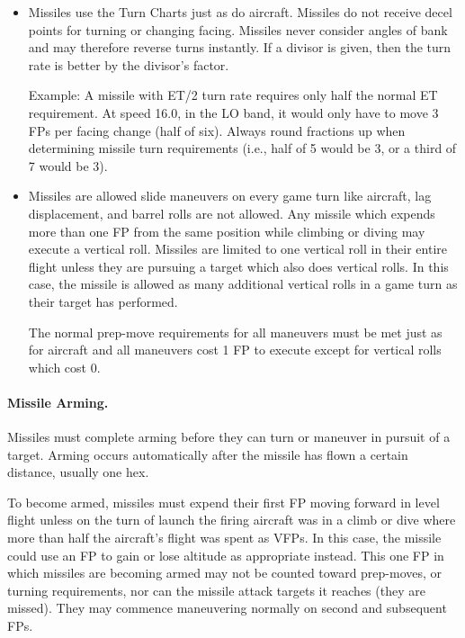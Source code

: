 \begin{itemize}
\begin{itemize}
    \end{itemize}

    \item {} Missiles use the Turn Charts just as do aircraft. Missiles do not receive decel points for turning or changing facing. Missiles never consider angles of bank and may therefore reverse turns instantly. If a divisor is given, then the turn rate is better by the divisor's factor.

    Example: A missile with ET/2 turn rate requires only half the normal ET requirement. At speed 16.0, in the LO band, it would only have to move 3 FPs per facing change (half of six). Always round fractions up when determining missile turn requirements (i.e., half of 5 would be 3, or a third of 7 would be 3).

    \item {} Missiles are allowed slide maneuvers on every game turn like aircraft, lag displacement, and barrel rolls are not allowed. Any missile which expends more than one FP from the same position while climbing or diving may execute a vertical roll. Missiles are limited to one vertical roll in their entire flight unless they are pursuing a target which also does vertical rolls. In this case, the missile is allowed as many additional vertical rolls in a game turn as their target has performed.

    The normal prep-move requirements for all maneuvers must be met just as for aircraft and all maneuvers cost 1 FP to execute except for vertical rolls which cost 0. 

\end{itemize}

\paragraph{Missile Arming.} Missiles must complete arming before they can turn or maneuver in pursuit of a target. Arming occurs automatically after the missile has flown a certain distance, usually one hex.

To become armed, missiles must expend their first FP moving forward in level flight unless on the turn of launch the firing aircraft was in a climb or dive where more than half the aircraft's flight was spent as VFPs. In this case, the missile could use an FP to gain or lose altitude as appropriate instead. This one FP in which missiles are becoming armed may not be counted toward prep-moves, or turning requirements, nor can the missile attack targets it reaches (they are missed). They may commence maneuvering normally on second and subsequent FPs.                                                          

